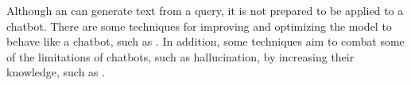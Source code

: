 Although an {\llm} can generate text from a query, it is not prepared to be applied to a chatbot. There are some techniques for improving and optimizing the model to behave like a chatbot, such as {\rlhf}. In addition, some techniques aim to combat some of the limitations of chatbots, such as hallucination, by increasing their knowledge, such as {\rag}.


       



